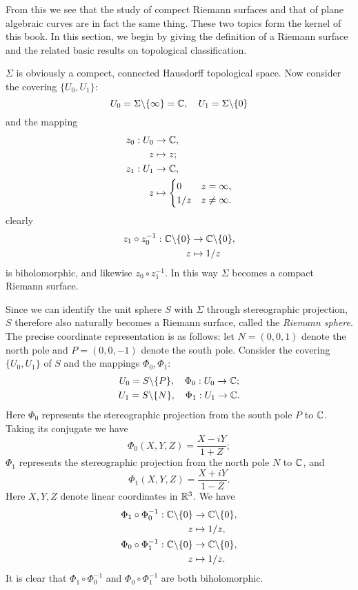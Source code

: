 From this we see that the study of compect Riemann surfaces and that of plane algebraic curves are in fact the same thing. These two topics form the kernel of this book. In this section, we begin by giving the definition of a Riemann surface and the related basic results on topological classification. 
\begin{example}[The set of extended complex numbers $\Sigma=\C\cup\{\infty\}$ (one point compactification of complex numbers)]
    $\Sigma$ is obviously a compect, connected Hausdorff topological space. Now consider the covering $\{U_0,U_1\}$: 
    \[U_0=\Sigma\backslash\{\infty\}=\mathbb{C}, \quad U_1=\Sigma\backslash\{0\}\]
    and the mapping 
    \begin{align*}
        z_0:U_0&\to\mathbb{C}, \\
        z&\mapsto z; \\
        z_1:U_1&\to\mathbb{C}, \\
        z&\mapsto\begin{cases}
            0&z=\infty, \\
            1/z&z\neq\infty. 
        \end{cases}
    \end{align*}
    clearly
    \begin{align*}
        z_1\circ z_0^{-1}:\mathbb{C}\backslash\{0\}&\to\mathbb{C}\backslash\{0\}, \\
        z&\mapsto1/z
    \end{align*}
    is biholomorphic, and likewise $z_0\circ z_1^{-1}$. In this way $\Sigma$ becomes a compact Riemann surface. 

    Since we can identify the unit sphere $S$ with $\Sigma$ through stereographic projection, $S$ therefore also naturally becomes a Riemann surface, called the \textit{Riemann sphere}. The precise coordinate representation is as follows: let $N=(0,0,1)$ denote the north pole and $P=(0,0,-1)$ denote the south pole. Consider the covering $\{U_0,U_1\}$ of $S$ and the mappings $\Phi_0,\Phi_1$: 
    \begin{gather*}
        U_0=S\backslash\{P\}, \quad\Phi_0:U_0\to\mathbb{C}; \\
        U_1=S\backslash\{N\}, \quad\Phi_1:U_1\to\mathbb{C}. 
    \end{gather*}
    Here $\Phi_0$ represents the stereographic projection from the south pole $P$ to $\mathbb{C}$. Taking its conjugate we have 
    \[\Phi_0(X,Y,Z)=\frac{X-iY}{1+Z}; \]
    $\Phi_1$ represents the stereographic projection from the north pole $N$ to $\mathbb{C}$, and 
    \[\Phi_1(X,Y,Z)=\frac{X+iY}{1-Z}. \]
    Here $X,Y,Z$ denote linear coordinates in $\mathbb{R}^3$. We have 
    \begin{align*}
        \Phi_1\circ\Phi_0^{-1}:\mathbb{C}\backslash\{0\}&\to\mathbb{C}\backslash\{0\}, \\
        z&\mapsto1/z, \\
        \Phi_0\circ\Phi_1^{-1}:\mathbb{C}\backslash\{0\}&\to\mathbb{C}\backslash\{0\}, \\
        z&\mapsto1/z. 
    \end{align*}
    It is clear that $\Phi_1\circ\Phi_0^{-1}$ and $\Phi_0\circ\Phi_1^{-1}$ are both biholomorphic. 


\end{example}
